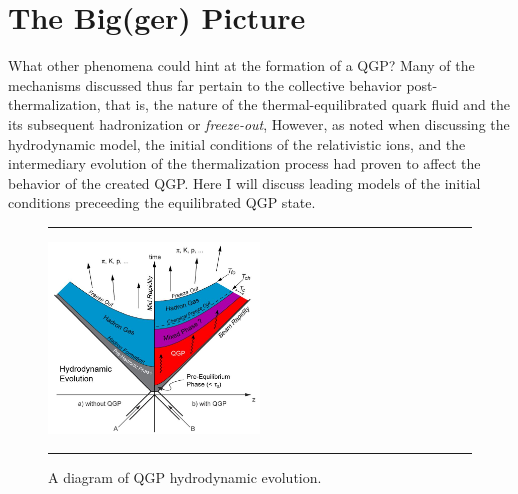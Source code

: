 \section{The Big(ger) Picture}
What other phenomena could hint at the formation of a QGP? Many of the mechanisms discussed thus far pertain to the collective behavior post-thermalization, that is, the nature of the thermal-equilibrated quark fluid and the its subsequent hadronization or \textit{freeze-out}, However, as noted when discussing the hydrodynamic model, the initial conditions of the relativistic ions, and the intermediary evolution of the thermalization process had proven to affect the behavior of the created QGP. Here I will discuss leading models of the initial conditions preceeding the equilibrated QGP state.

\begin{figure}[b!]
  \centering
    \rule{35em}{0.5pt}
    \includegraphics[width=0.5\textwidth]{Figures/hydrodynamicevolution.JPG}

  \caption[A diagram of QGP hydrodynamic evolution.]{A diagram of QGP hydrodynamic evolution.}
  \label{fig:hydroevolution}
    \rule{35em}{0.5pt}
\end{figure}

